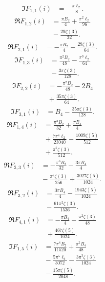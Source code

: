 \begin{align*}
\Im F_{1,1}(i) &=-\frac{\pi \ell_{2}}{8}.
\end{align*}
\begin{align*}
\Re F_{1,2}(i) &=\frac{\pi B_{2}}{4}+\frac{\pi^{2} \ell_{2}}{96} \\
 &{}-\frac{29 \zeta\left(3\right)}{32}.
\end{align*}
\begin{align*}
\Re F_{2,1}(i) &=-\frac{\pi B_{2}}{4}+\frac{29 \zeta\left(3\right)}{64}.
\end{align*}
\begin{align*}
\Im F_{1,3}(i) &=\frac{\pi^{2} B_{2}}{48}-\frac{\pi^{3} \ell_{2}}{64} \\
 &{}-\frac{3 \pi \zeta\left(3\right)}{128}.
\end{align*}
\begin{align*}
\Im F_{2,2}(i) &=-\frac{\pi^{2} B_{2}}{48}-2 B_{4} \\
 &{}+\frac{35 \pi \zeta\left(3\right)}{64}.
\end{align*}
\begin{align*}
\Im F_{3,1}(i) &=B_{4}-\frac{35 \pi \zeta\left(3\right)}{128}.
\end{align*}
\begin{align*}
\Re F_{1,4}(i) &=\frac{\pi^{3} B_{2}}{32}+\frac{\pi B_{4}}{4} \\
 &{}+\frac{7 \pi^{4} \ell_{2}}{23040}-\frac{1009 \zeta\left(5\right)}{512} \\
 &{}+\frac{\pi^{2} \zeta\left(3\right)}{512}.
\end{align*}
\begin{align*}
\Re F_{2,3}(i) &=-\frac{\pi^{3} B_{2}}{32}-\frac{3 \pi B_{4}}{4} \\
 &{}-\frac{\pi^{2} \zeta\left(3\right)}{256}+\frac{3027 \zeta\left(5\right)}{1024}.
\end{align*}
\begin{align*}
\Re F_{3,2}(i) &=\frac{3 \pi B_{4}}{4}-\frac{1943 \zeta\left(5\right)}{1024} \\
 &{}-\frac{61 \pi^{2} \zeta\left(3\right)}{1536}.
\end{align*}
\begin{align*}
\Re F_{4,1}(i) &=-\frac{\pi B_{4}}{4}+\frac{\pi^{2} \zeta\left(3\right)}{48} \\
 &{}+\frac{467 \zeta\left(5\right)}{1024}.
\end{align*}
\begin{align*}
\Im F_{1,5}(i) &=\frac{7 \pi^{4} B_{2}}{11520}+\frac{\pi^{2} B_{4}}{48} \\
 &{}-\frac{5 \pi^{5} \ell_{2}}{3072}-\frac{3 \pi^{3} \zeta\left(3\right)}{1024} \\
 &{}-\frac{15 \pi \zeta\left(5\right)}{2048}.
\end{align*}
